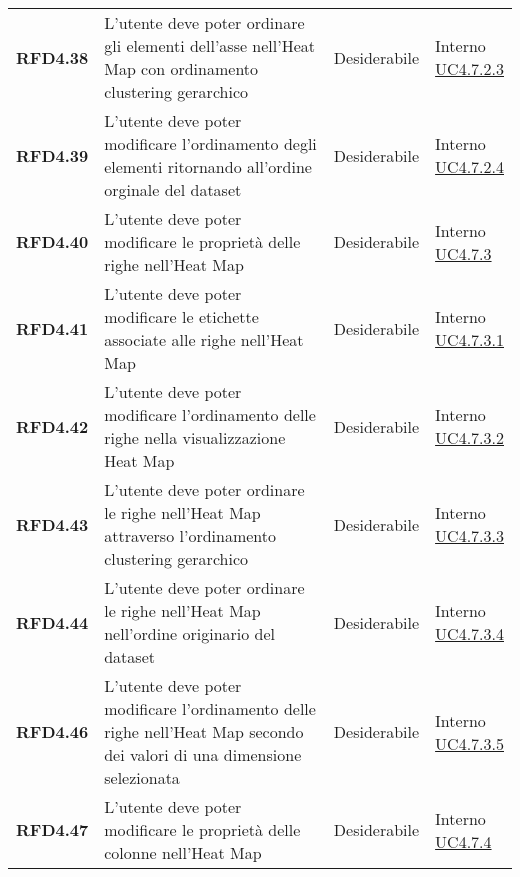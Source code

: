 \begin{longtable}[H]{>{\raggedright\bfseries}m{20mm} >{\raggedright}m{90mm} >{\raggedright}m{28mm} >{\raggedright\arraybackslash}m{30mm}}
    RFD4.38
    & L'utente deve poter ordinare gli elementi dell'asse nell'Heat Map con ordinamento clustering gerarchico
    & Desiderabile
    & \makecell{ Interno \\  \hyperref[spar:uc4.7.2.3]{UC4.7.2.3} }\\

    RFD4.39
    & L'utente deve poter modificare l'ordinamento degli elementi ritornando all'ordine orginale del dataset
    & Desiderabile
    & \makecell{ Interno \\  \hyperref[spar:uc4.7.2.4]{UC4.7.2.4} }\\

    RFD4.40
    & L'utente deve poter modificare le proprietà delle righe nell'Heat Map
    & Desiderabile
    & \makecell{ Interno \\  \hyperref[par:uc4.7.3]{UC4.7.3} }\\

    RFD4.41
    & L'utente deve poter modificare le etichette associate alle righe nell'Heat Map
    & Desiderabile
    & \makecell{ Interno \\  \hyperref[spar:uc4.7.3.1]{UC4.7.3.1} }\\

    RFD4.42
    & L'utente deve poter modificare l'ordinamento delle righe nella visualizzazione Heat Map
    & Desiderabile
    & \makecell{ Interno \\  \hyperref[spar:uc4.7.3.2]{UC4.7.3.2} }\\

    RFD4.43
    & L'utente deve poter ordinare le righe nell'Heat Map attraverso l'ordinamento clustering gerarchico
    & Desiderabile
    & \makecell{ Interno \\  \hyperref[spar:uc4.7.3.3]{UC4.7.3.3} }\\

    RFD4.44
    & L'utente deve poter ordinare le righe nell'Heat Map nell'ordine originario del dataset
    & Desiderabile
    & \makecell{ Interno \\  \hyperref[spar:uc4.7.3.4]{UC4.7.3.4} }\\

    RFD4.46
    & L'utente deve poter modificare l'ordinamento delle righe nell'Heat Map secondo dei valori di una dimensione selezionata
    & Desiderabile
    & \makecell{ Interno \\  \hyperref[spar:uc4.7.3.5]{UC4.7.3.5} }\\

    RFD4.47
    & L'utente deve poter modificare le proprietà delle colonne nell'Heat Map
    & Desiderabile
    & \makecell{ Interno \\  \hyperref[par:uc4.7.4]{UC4.7.4} }\\


\end{longtable}
